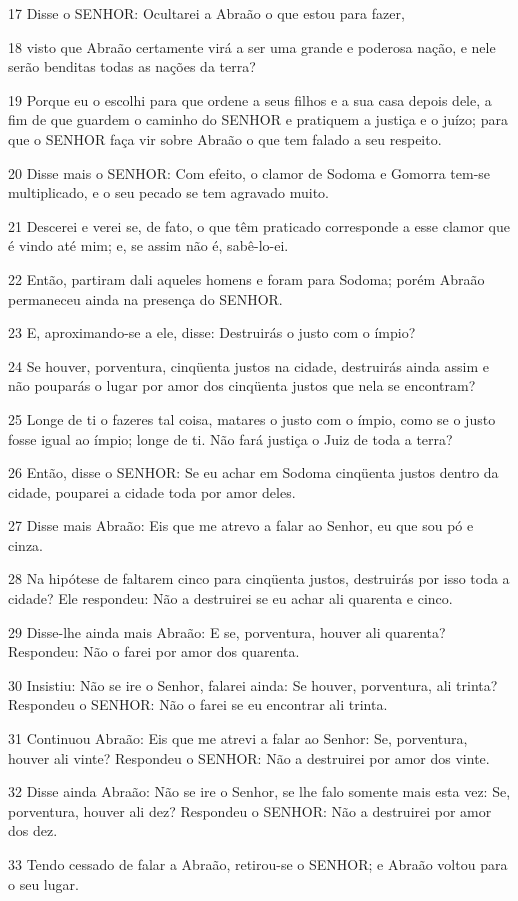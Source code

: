 \par 17 Disse o SENHOR: Ocultarei a Abraão o que estou para fazer,
\par 18 visto que Abraão certamente virá a ser uma grande e poderosa nação, e nele serão benditas todas as nações da terra?
\par 19 Porque eu o escolhi para que ordene a seus filhos e a sua casa depois dele, a fim de que guardem o caminho do SENHOR e pratiquem a justiça e o juízo; para que o SENHOR faça vir sobre Abraão o que tem falado a seu respeito.
\par 20 Disse mais o SENHOR: Com efeito, o clamor de Sodoma e Gomorra tem-se multiplicado, e o seu pecado se tem agravado muito.
\par 21 Descerei e verei se, de fato, o que têm praticado corresponde a esse clamor que é vindo até mim; e, se assim não é, sabê-lo-ei.
\par 22 Então, partiram dali aqueles homens e foram para Sodoma; porém Abraão permaneceu ainda na presença do SENHOR.
\par 23 E, aproximando-se a ele, disse: Destruirás o justo com o ímpio?
\par 24 Se houver, porventura, cinqüenta justos na cidade, destruirás ainda assim e não pouparás o lugar por amor dos cinqüenta justos que nela se encontram?
\par 25 Longe de ti o fazeres tal coisa, matares o justo com o ímpio, como se o justo fosse igual ao ímpio; longe de ti. Não fará justiça o Juiz de toda a terra?
\par 26 Então, disse o SENHOR: Se eu achar em Sodoma cinqüenta justos dentro da cidade, pouparei a cidade toda por amor deles.
\par 27 Disse mais Abraão: Eis que me atrevo a falar ao Senhor, eu que sou pó e cinza.
\par 28 Na hipótese de faltarem cinco para cinqüenta justos, destruirás por isso toda a cidade? Ele respondeu: Não a destruirei se eu achar ali quarenta e cinco.
\par 29 Disse-lhe ainda mais Abraão: E se, porventura, houver ali quarenta? Respondeu: Não o farei por amor dos quarenta.
\par 30 Insistiu: Não se ire o Senhor, falarei ainda: Se houver, porventura, ali trinta? Respondeu o SENHOR: Não o farei se eu encontrar ali trinta.
\par 31 Continuou Abraão: Eis que me atrevi a falar ao Senhor: Se, porventura, houver ali vinte? Respondeu o SENHOR: Não a destruirei por amor dos vinte.
\par 32 Disse ainda Abraão: Não se ire o Senhor, se lhe falo somente mais esta vez: Se, porventura, houver ali dez? Respondeu o SENHOR: Não a destruirei por amor dos dez.
\par 33 Tendo cessado de falar a Abraão, retirou-se o SENHOR; e Abraão voltou para o seu lugar.

